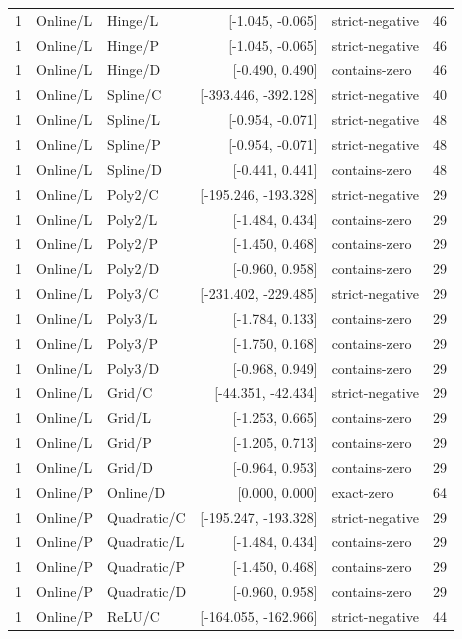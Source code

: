 \begin{longtable}{lllrlr}
1 & Online/L & Hinge/L & [-1.045, -0.065] & strict-negative & 46 \\
1 & Online/L & Hinge/P & [-1.045, -0.065] & strict-negative & 46 \\
1 & Online/L & Hinge/D & [-0.490, 0.490] & contains-zero & 46 \\
1 & Online/L & Spline/C & [-393.446, -392.128] & strict-negative & 40 \\
1 & Online/L & Spline/L & [-0.954, -0.071] & strict-negative & 48 \\
1 & Online/L & Spline/P & [-0.954, -0.071] & strict-negative & 48 \\
1 & Online/L & Spline/D & [-0.441, 0.441] & contains-zero & 48 \\
1 & Online/L & Poly2/C & [-195.246, -193.328] & strict-negative & 29 \\
1 & Online/L & Poly2/L & [-1.484, 0.434] & contains-zero & 29 \\
1 & Online/L & Poly2/P & [-1.450, 0.468] & contains-zero & 29 \\
1 & Online/L & Poly2/D & [-0.960, 0.958] & contains-zero & 29 \\
1 & Online/L & Poly3/C & [-231.402, -229.485] & strict-negative & 29 \\
1 & Online/L & Poly3/L & [-1.784, 0.133] & contains-zero & 29 \\
1 & Online/L & Poly3/P & [-1.750, 0.168] & contains-zero & 29 \\
1 & Online/L & Poly3/D & [-0.968, 0.949] & contains-zero & 29 \\
1 & Online/L & Grid/C & [-44.351, -42.434] & strict-negative & 29 \\
1 & Online/L & Grid/L & [-1.253, 0.665] & contains-zero & 29 \\
1 & Online/L & Grid/P & [-1.205, 0.713] & contains-zero & 29 \\
1 & Online/L & Grid/D & [-0.964, 0.953] & contains-zero & 29 \\
1 & Online/P & Online/D & [0.000, 0.000] & exact-zero & 64 \\
1 & Online/P & Quadratic/C & [-195.247, -193.328] & strict-negative & 29 \\
1 & Online/P & Quadratic/L & [-1.484, 0.434] & contains-zero & 29 \\
1 & Online/P & Quadratic/P & [-1.450, 0.468] & contains-zero & 29 \\
1 & Online/P & Quadratic/D & [-0.960, 0.958] & contains-zero & 29 \\
1 & Online/P & ReLU/C & [-164.055, -162.966] & strict-negative & 44 \\

\end{longtable}
